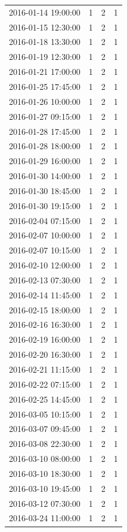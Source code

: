 \begin{tabular}{lrrr}
2016-01-14 19:00:00 & 1 & 2 & 1 \\
2016-01-15 12:30:00 & 1 & 2 & 1 \\
2016-01-18 13:30:00 & 1 & 2 & 1 \\
2016-01-19 12:30:00 & 1 & 2 & 1 \\
2016-01-21 17:00:00 & 1 & 2 & 1 \\
2016-01-25 17:45:00 & 1 & 2 & 1 \\
2016-01-26 10:00:00 & 1 & 2 & 1 \\
2016-01-27 09:15:00 & 1 & 2 & 1 \\
2016-01-28 17:45:00 & 1 & 2 & 1 \\
2016-01-28 18:00:00 & 1 & 2 & 1 \\
2016-01-29 16:00:00 & 1 & 2 & 1 \\
2016-01-30 14:00:00 & 1 & 2 & 1 \\
2016-01-30 18:45:00 & 1 & 2 & 1 \\
2016-01-30 19:15:00 & 1 & 2 & 1 \\
2016-02-04 07:15:00 & 1 & 2 & 1 \\
2016-02-07 10:00:00 & 1 & 2 & 1 \\
2016-02-07 10:15:00 & 1 & 2 & 1 \\
2016-02-10 12:00:00 & 1 & 2 & 1 \\
2016-02-13 07:30:00 & 1 & 2 & 1 \\
2016-02-14 11:45:00 & 1 & 2 & 1 \\
2016-02-15 18:00:00 & 1 & 2 & 1 \\
2016-02-16 16:30:00 & 1 & 2 & 1 \\
2016-02-19 16:00:00 & 1 & 2 & 1 \\
2016-02-20 16:30:00 & 1 & 2 & 1 \\
2016-02-21 11:15:00 & 1 & 2 & 1 \\
2016-02-22 07:15:00 & 1 & 2 & 1 \\
2016-02-25 14:45:00 & 1 & 2 & 1 \\
2016-03-05 10:15:00 & 1 & 2 & 1 \\
2016-03-07 09:45:00 & 1 & 2 & 1 \\
2016-03-08 22:30:00 & 1 & 2 & 1 \\
2016-03-10 08:00:00 & 1 & 2 & 1 \\
2016-03-10 18:30:00 & 1 & 2 & 1 \\
2016-03-10 19:45:00 & 1 & 2 & 1 \\
2016-03-12 07:30:00 & 1 & 2 & 1 \\
2016-03-24 11:00:00 & 1 & 2 & 1 \\

\end{tabular}
